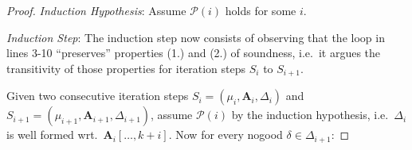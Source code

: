\documentclass{vutinfth} %
\theoremstyle{example}
\theoremstyle{definition}
\theoremstyle{theorem}
\theoremstyle{lemma}
\theoremstyle{corollary}
\newcommand{\ass}{\mathbf{A}}
\newcommand{\abef}{\ass_{i}[\ldots, k + i]}
\newcommand{\dbef}{\Delta_{i}}
\newcommand{\daf}{\Delta_{i+1}}
\newcommand{\welf}{well formed\xspace}
\newcommand{\sgl}{\mu}
\begin{document}
\begin{proof}
\emph{Induction Hypothesis}: Assume $\mathcal{P}(i)$ holds for some $i$.

\emph{Induction Step}: The induction step now consists of observing that the loop in lines 3-10 \enquote{preserves} properties (1.) and (2.) of soundness, i.e.~it argues the transitivity of those properties for iteration steps $S_{i}$ to $S_{i+1}$.


Given two consecutive iteration steps $S_{i} = (\sgl_{i}, \ass_{i}, \Delta_{i})$ and $S_{i+1} = (\sgl_{i+1}, \ass_{i+1}, \Delta_{i+1})$, assume $\mathcal{P}(i)$ by the induction hypothesis, i.e.~$\dbef$ is \welf wrt.~$\abef$. Now for every nogood $\delta \in \daf$:


\end{proof}
\end{document}
